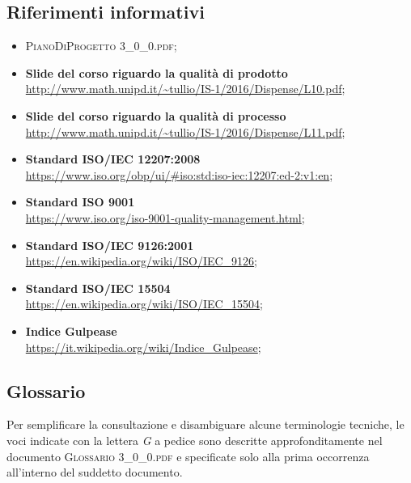 \subsection{Riferimenti informativi}
\begin{itemize}
	\item \textsc{PianoDiProgetto 3\_0\_0.pdf};
	\item \textbf{Slide del corso riguardo la qualità di prodotto}\\ \url{http://www.math.unipd.it/~tullio/IS-1/2016/Dispense/L10.pdf};
	\item \textbf{Slide del corso riguardo la qualità di processo}\\ \url{http://www.math.unipd.it/~tullio/IS-1/2016/Dispense/L11.pdf};
	\item \textbf{Standard ISO/IEC 12207:2008}\\ \url{https://www.iso.org/obp/ui/#iso:std:iso-iec:12207:ed-2:v1:en};
	\item \textbf{Standard ISO 9001}\\ \url{https://www.iso.org/iso-9001-quality-management.html};
	\item \textbf{Standard ISO/IEC 9126:2001}\\ \url{https://en.wikipedia.org/wiki/ISO/IEC_9126};
	\item \textbf{Standard ISO/IEC 15504}\\ \url{https://en.wikipedia.org/wiki/ISO/IEC_15504};
	\item \textbf{Indice Gulpease}\\ \url{https://it.wikipedia.org/wiki/Indice_Gulpease};	
\end{itemize}

\subsection{Glossario}
Per semplificare la consultazione e disambiguare alcune terminologie tecniche, le voci indicate con la lettera \textit{G} a pedice sono descritte approfonditamente nel documento \textsc{Glossario 3\_0\_0.pdf} e specificate solo alla prima occorrenza all'interno del suddetto documento.